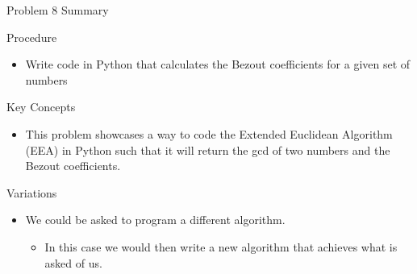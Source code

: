 \begin{summary}{Problem 8 Summary}
    \begin{statement}{Procedure}
        \begin{itemize}
            \item Write code in Python that calculates the Bezout coefficients for a given set of numbers 
        \end{itemize}
    \end{statement}
    \begin{statement}{Key Concepts}
        \begin{itemize}
            \item This problem showcases a way to code the Extended Euclidean Algorithm (EEA) in Python such that it will return the gcd of two numbers and the Bezout coefficients.
        \end{itemize}
    \end{statement}
    \begin{statement}{Variations}
        \begin{itemize}
            \item We could be asked to program a different algorithm.
            \begin{itemize}
                \item In this case we would then write a new algorithm that achieves what is asked of us.
            \end{itemize}
        \end{itemize}
    \end{statement}
\end{summary}

